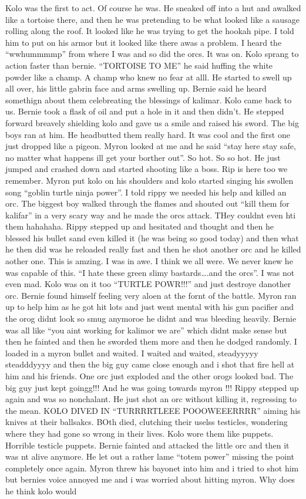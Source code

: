 \begin{multicols}{2}
Kolo was the first to act. Of course he was. He sneaked off into a hut and awalked like a tortoise there, and then he was pretending to be what looked like a sausage rolling along the roof. It looked like he was trying to get the hookah pipe. I told him to put on his armor but it looked like there awas a problem. I heard the “wwhummmmp” from where I was and so did the orcs. It was on. Kolo sprang to action faster than bernie. “TORTOISE TO ME” he said huffing the white powder like a champ. A champ who knew no fear at alll. He started to swell up all over, his little gabrin face and arms swelling up. Bernie said he heard somethign about them celebreating the blessings of kalimar. Kolo came back to us. Bernie took a flask of oil and put a hole in it and then didn’t. He stepped forward breavely shielding kolo and gave us a smile and raised his sword. The big boys ran at him. He headbutted them really hard. It was cool and the first one just dropped like a pigeon. Myron looked at me and he said “stay here stay safe, no matter what happens ill get your borther out”. So hot. So so hot. He just jumped and crashed down and started shooting like a boss. Rip is here too we remember. Myron put kolo on his shoulders and kolo started singing his swollen song “goblin turtle ninja power”. I told rippy we needed his help and killed an orc. The biggest boy walked through the flames and shouted out “kill them for kalifar” in a very scary way and he made the orcs attack. THey couldnt even hti them hahahaha. Rippy stepped up and hesitated and thought and then he blessed his bullet sand even killed it (he was being so good today) and then what he then did was he reloaded really fast and then he shot another orc and he killed aother one. This is amzing. I was in awe. I think we all were. We never knew he was capable of this. “I hate these green slimy bastards….and the orcs”. I was not even mad. Kolo was on it too “TURTLE POWR!!!” and just destroye danother orc. Bernie found himself feeling very aloen at the fornt of the battle. Myron ran up to help him as he got hit lots and just went mental with his gun pacifier and the orog didnt look so smug anymoroe he didnt and was bleeding heavily. Bernie was all like “you aint working for kalimor we are” which didnt make sense but then he fainted and then he sworded them more and then he dodged randomly. I loaded in a myron bullet and waited. I waited and waited, steadyyyyy steadddyyyy and then the big guy came close enough and i shot that fire hell at him and his friends. One orc just exploded and the other orogs looked bad. The big guy just kept goingg!!! And he was going towards myron !!! Rippy stepped up again and was so nonchalant. He just shot an orc without killing it, regressing to the mean. KOLO DIVED IN “TURRRRTLEEE POOOWEEERRRR” aiming his knives at their ballsakcs. BOth died, clutching their uselss testicles, wondering where they had gone so wrong in their lives. Kolo wore them like puppets. Horrible testicle puppets. Bernie fainted and attacked the little orc and then it was nt alive anymore. He let out a rather lame “totem power” missing the point completely once again. Myron threw his bayonet into him and i tried to shot him but bernies voice annoyed me and i was worried about hitting myron. Why does he think kolo would 
\end{multicols}
